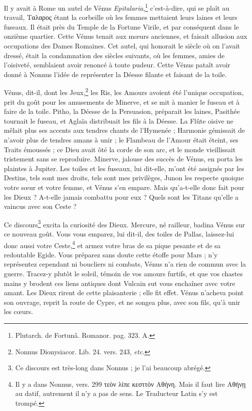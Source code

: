 \documentclass[a4paper, 18pt, oneside]{article}
\begin{document}
Il y avait à Rome un autel de Vénus \emph{Epitalaria},\footnote{Plutarch. de Fortunâ. Romanor. pag. 323. A.} c'est-à-dire, qui se plaît au travail, Ταλαρος étant la corbeille où les femmes mettaient leurs laines et leurs fuseaux. Il était près du Temple de la Fortune Virile, et par conséquent dans le onzième quartier. Cette Vénus tenait aux mœurs anciennes, et faisait allusion aux occupations des Dames Romaines. Cet autel, qui honorait le siècle où on l'avait dressé, était la condamnation des siècles suivants, où les femmes, amies de l'oisiveté, semblaient avoir renoncé à toute pudeur. Cette Vénus pataît avoir donné à Nonnus l'idée de représenter la Déesse filante et faisant de la toile.

Vénus, dit-il, dont les Jeux,\footnote{Nonnus Dionysiacor. Lib. 24. vers. 243, \emph{etc.}} les Ris, les Amours avoient été l'unique occupation, prit du goût pour les amusements de Minerve, et se mit à manier le fuseau et à faire de la toile. Pitho, la Déesse de la Persuasion, préparait les laines, Pasithée tournait le fuseau, et Aglaïa distribuait les fils à la Déesse. La Flûte oisive ne mêlait plus ses accents aux tendres chants de l'Hymenée ; Harmonie gémissait de n'avoir plus de tendres amans à unir ; le Flambeau de l'Amour était éteint, ses Traits émoussés ; ce Dieu avait ôté la corde de son arc, et le monde vieillissait tristement sans se reproduire. Minerve, jalouse des succès de Vénus, en porta les plaintes à Jupiter. Les toiles et les fuseaux, lui dit-elle, m'ont été assignés par les Destins, tels sont mes droits, tels sont mes privilèges, Junon les respecte quoique votre sœur et votre femme, et Vénus s'en empare. Mais qu'a-t-elle donc fait pour les Dieux ? A-t-elle jamais combattu pour eux ? Quels sont les Titans qu'elle a vaincus avec son Ceste ?

Ce discours\footnote{Ce discours est très-long dans Nonnus ; je l'ai beaucoup abrégé.} excita la curiosité des Dieux. Mercure, né railleur, badina Vénus sur ce nouveau goût. Vous vous emparez, lui dit-il, des toiles de Pallas, laissez-lui donc aussi votre Ceste,\footnote{Il y a dans Nonnus, vers. 299 τεὸν λίπε κεσττὸν Αθήνη. Mais il faut lire Αθήνῃ au datif, autrement il n'y a pas de sens. Le Traducteur Latin s'y est trompé.} et armez votre bras de sa pique pesante et de sa redoutable Egide. Vous préparez sans doute cette étoffe pour Mars ; n'y représentez cependant ni boucliers ni combats, Vénus n'a rien de commun avec la guerre. Tracez-y plutôt le soleil, témoin de vos amours furtifs, et que vos chastes mains y brodent ces liens antiques dont Vulcain sut vous enchaîner avec votre amant. Les Dieux rirent de cette plaisanterie ; elle fit effet. Vénus n'acheva point son ouvrage, reprit la route de Cypre, et ne songea plus, avec son fils, qu'à unir les cœurs.
\end{document}
